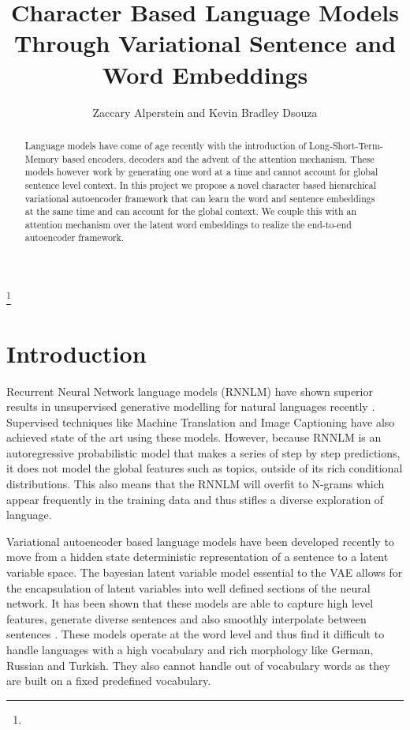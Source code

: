 \documentclass[journal, 12pt, draftcls, onecolumn]{IEEEtran}
\begin{document}
\title{Character Based Language Models Through Variational Sentence and Word Embeddings}
\author{Zaccary Alperstein and Kevin Bradley Dsouza}
{} 

\maketitle
\thanks{}
\begin{abstract}
Language models have come of age recently with the introduction of Long-Short-Term-Memory based encoders, decoders and the advent of the attention mechanism. These models however work by generating one word at a time and cannot account for global sentence level context. In this project we propose a novel character based hierarchical variational autoencoder framework that can learn the word and sentence embeddings at the same time and can account for the global context. We couple this with an attention mechanism over the latent word embeddings to realize the end-to-end autoencoder framework.     
 
\end{abstract}

\section {Introduction} \label{intro}
Recurrent Neural Network language models (RNNLM) have shown superior results in unsupervised generative modelling for natural languages recently \cite{C1}. Supervised techniques like Machine Translation \cite{C2} and Image Captioning \cite{C3} have also achieved state of the art using these models. However, because RNNLM is an autoregressive probabilistic model that makes a series of step by step predictions, it does not model the global features such as topics, outside of its rich conditional distributions. This also means that the RNNLM will overfit to N-grams which appear frequently in the training data and thus stifles a diverse exploration of language.   

Variational autoencoder based language models have been developed recently to move from a hidden state deterministic representation of a sentence to a latent variable space. The bayesian latent variable model essential to the VAE allows for the encapsulation of latent variables into well defined sections of the neural network. It has been shown that these models are able to capture high level features, generate diverse sentences and also smoothly interpolate between sentences \cite{C4}. These models operate at the word level and thus find it difficult to handle languages with a high vocabulary and rich morphology like German, Russian and Turkish. They also cannot handle out of vocabulary words as they are built on a fixed predefined vocabulary.
\end{document}
